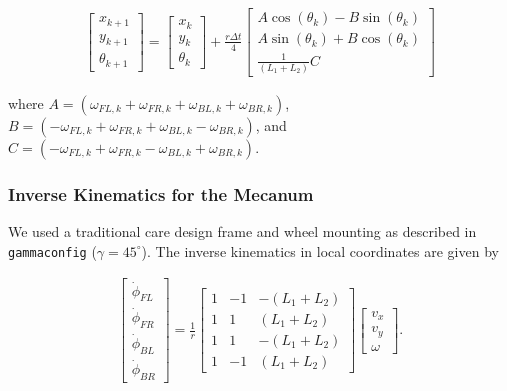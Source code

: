 \[\begin{aligned}
\begin{bmatrix} x_{k+1}\\[3mm] y_{k+1}\\[3mm] \theta_{k+1} \end{bmatrix}
=   \begin{bmatrix} x_{k}\\[3mm] y_{k}\\[3mm] \theta_{k} \end{bmatrix} +
\frac{ r\Delta t }{4} \begin{bmatrix} A\cos(\theta_{k})  - B \sin(\theta_{k})   \\[3mm]
A\sin(\theta_{k})  + B \cos(\theta_{k})                     \\[3mm]
\frac{1}{(L_1+L_2) } C
\end{bmatrix}
\end{aligned}\]

where
\(A = \left( \omega_{FL,k} + \omega_{FR,k} + \omega_{BL,k} + \omega_{BR,k} \right)\),
\(B = \left(-\omega_{FL,k} + \omega_{FR,k} + \omega_{BL,k} - \omega_{BR,k}  \right)\),
and
\(C =  \left( -\omega_{FL,k} + \omega_{FR,k} - \omega_{BL,k} +\omega_{BR,k} \right)\).

\hypertarget{inverse-kinematics-for-the-mecanum}{%
\subsubsection{Inverse Kinematics for the
Mecanum}\label{inverse-kinematics-for-the-mecanum}}

We used a traditional care design frame and wheel mounting as described
in \texttt{gammaconfig} (\(\gamma = 45^\circ\)). The inverse kinematics
in local coordinates are given by

\[\begin{aligned}
\begin{bmatrix}\dot{\phi}_{FL} \\[3mm] \dot{\phi}_{FR} \\[3mm] \dot{\phi}_{BL} \\[3mm] \dot{\phi}_{BR} \end{bmatrix}
=
\frac{1}{ r}
\begin{bmatrix} 1 & -1 & -(L_1+L_2)  \\[3mm]
                1 & 1 & (L_1+L_2)  \\[3mm]
                1 & 1 & -(L_1+L_2)  \\[3mm]
                1 & -1 & (L_1+L_2)
         \end{bmatrix}
\begin{bmatrix}v_x \\[3mm] v_y \\[3mm] \omega \end{bmatrix} .
\end{aligned}\]

